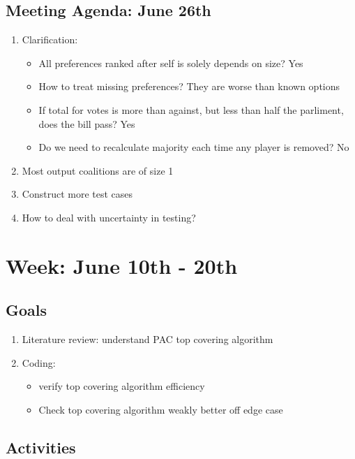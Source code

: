 \documentclass[a4paper]{article}
\begin{document}
\subsection*{Meeting Agenda: June 26th}

\begin{enumerate}
  \item Clarification:
  \begin{itemize}
    \item All preferences ranked after self is solely depends on size? Yes
    \item How to treat missing preferences? They are worse than known options
    \item If total for votes is more than against, but less than half the parliment, does the bill pass? Yes
    \item Do we need to recalculate majority each time any player is removed? No
  \end{itemize}
  \item Most output coalitions are of size 1
  \item Construct more test cases
  \item How to deal with uncertainty in testing?
\end{enumerate}

\section*{Week: June 10th - 20th}

\subsection*{Goals}

\begin{enumerate}
  \item Literature review: understand PAC top covering algorithm
  \item Coding:
  \begin{itemize}
    \item verify top covering algorithm efficiency
    \item Check top covering algorithm weakly better off edge case
  \end{itemize}
\end{enumerate}

\subsection*{Activities}
\end{document}
